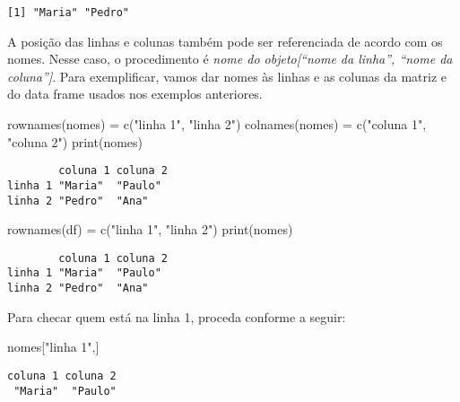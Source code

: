 \documentclass[
  letterpaper,
  DIV=11,
  numbers=noendperiod]{scrreprt}
\newenvironment{Shaded}{\begin{snugshade}}{\end{snugshade}}
\newcommand{\FunctionTok}[1]{\textcolor[rgb]{0.28,0.35,0.67}{#1}}
\newcommand{\NormalTok}[1]{\textcolor[rgb]{0.00,0.23,0.31}{#1}}
\newcommand{\OtherTok}[1]{\textcolor[rgb]{0.00,0.23,0.31}{#1}}
\newcommand{\StringTok}[1]{\textcolor[rgb]{0.13,0.47,0.30}{#1}}
\begin{document}
\begin{verbatim}
[1] "Maria" "Pedro"
\end{verbatim}

A posição das linhas e colunas também pode ser referenciada de acordo
com os nomes. Nesse caso, o procedimento é \emph{nome do objeto{[}``nome
da linha'', ``nome da coluna''{]}}. Para exemplificar, vamos dar nomes
às linhas e as colunas da matriz e do data frame usados nos exemplos
anteriores.

\begin{Shaded}
\begin{Highlighting}[]
\FunctionTok{rownames}\NormalTok{(nomes) }\OtherTok{=} \FunctionTok{c}\NormalTok{(}\StringTok{"linha 1"}\NormalTok{, }\StringTok{"linha 2"}\NormalTok{)}
\FunctionTok{colnames}\NormalTok{(nomes) }\OtherTok{=} \FunctionTok{c}\NormalTok{(}\StringTok{"coluna 1"}\NormalTok{, }\StringTok{"coluna 2"}\NormalTok{)}
\FunctionTok{print}\NormalTok{(nomes)}
\end{Highlighting}
\end{Shaded}

\begin{verbatim}
        coluna 1 coluna 2
linha 1 "Maria"  "Paulo" 
linha 2 "Pedro"  "Ana"   
\end{verbatim}

\begin{Shaded}
\begin{Highlighting}[]
\FunctionTok{rownames}\NormalTok{(df) }\OtherTok{=} \FunctionTok{c}\NormalTok{(}\StringTok{"linha 1"}\NormalTok{, }\StringTok{"linha 2"}\NormalTok{)}
\FunctionTok{print}\NormalTok{(nomes)}
\end{Highlighting}
\end{Shaded}

\begin{verbatim}
        coluna 1 coluna 2
linha 1 "Maria"  "Paulo" 
linha 2 "Pedro"  "Ana"   
\end{verbatim}

Para checar quem está na linha 1, proceda conforme a seguir:

\begin{Shaded}
\begin{Highlighting}[]
\NormalTok{nomes[}\StringTok{"linha 1"}\NormalTok{,]}
\end{Highlighting}
\end{Shaded}

\begin{verbatim}
coluna 1 coluna 2 
 "Maria"  "Paulo" 
\end{verbatim}
\end{document}
